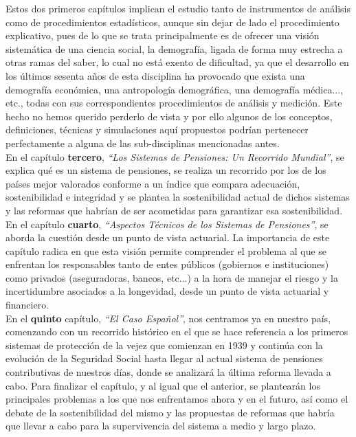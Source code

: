 Estos dos primeros cap\'itulos implican el estudio tanto de instrumentos de an\'alisis como de procedimientos estad\'isticos, aunque sin dejar de lado el procedimiento explicativo, pues de lo que se trata principalmente es de ofrecer una visi\'on sistem\'atica de una ciencia social, la demograf\'ia, ligada de forma muy estrecha a otras ramas del saber, lo cual no est\'a exento de dificultad, ya que el desarrollo en los \'ultimos sesenta a\~nos de esta disciplina ha provocado que exista una demograf\'ia econ\'omica, una antropolog\'ia demogr\'afica, una demograf\'ia m\'edica..., etc., todas con sus correspondientes procedimientos de an\'alisis y medici\'on. Este hecho no hemos querido perderlo de vista y por ello algunos de los conceptos, definiciones, técnicas y simulaciones aquí propuestos podrían pertenecer perfectamente a alguna de las sub-disciplinas mencionadas antes.\\

En el cap\'itulo \textbf{tercero}, \textit{``Los Sistemas de Pensiones: Un Recorrido Mundial''}, se explica qu\'e es un sistema de pensiones, se realiza un recorrido por los de los pa\'ises mejor valorados conforme a un índice que compara adecuación, sostenibilidad e integridad y se plantea la sostenibilidad actual de dichos sistemas y las reformas que habr\'ian de ser acometidas para garantizar esa sostenibilidad.\\

En el cap\'itulo \textbf{cuarto}, \textit{``Aspectos T\'ecnicos de los Sistemas de Pensiones''}, se aborda la cuestión desde un punto de vista actuarial. La importancia de este capítulo radica en que esta visión permite comprender el problema al que se enfrentan los responsables tanto de entes públicos (gobiernos e instituciones) como privados (aseguradoras, bancos, etc...) a la hora de manejar el riesgo y la incertidumbre asociados a la longevidad, desde un punto de vista actuarial y financiero.\\

En el \textbf{quinto} cap\'itulo, \textit{``El Caso Español''}, nos centramos ya en nuestro país, comenzando con un recorrido hist\'orico en el que se hace referencia a los primeros sistemas de protecci\'on de la vejez que comienzan en 1939 y contin\'ua con la evoluci\'on de la Seguridad Social hasta llegar al actual sistema de pensiones contributivas de nuestros d\'ias, donde se analizar\'a la \'ultima reforma llevada a cabo. Para finalizar el cap\'itulo, y al igual que el anterior, se plantearán los principales problemas a los que nos enfrentamos ahora y en el futuro, así como el debate de la sostenibilidad del mismo y las propuestas de reformas que habr\'ia que llevar a cabo para la supervivencia del sistema a medio y largo plazo.\\ %

